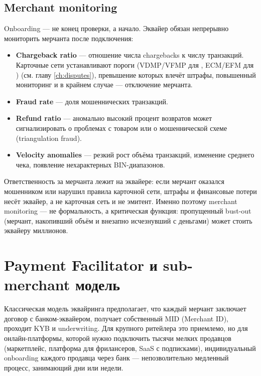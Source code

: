\subsection*{Merchant monitoring}

Onboarding — не конец проверки, а начало. Эквайер обязан непрерывно мониторить мерчанта после подключения:

\begin{itemize}
  \item \textbf{Chargeback ratio} — отношение числа chargebacks
        к числу транзакций. Карточные сети устанавливают пороги
        (VDMP/VFMP для , ECM/EFM
        для ) (см. главу \ref{ch:disputes}),
        превышение которых влечёт штрафы, повышенный мониторинг
        и в крайнем случае — отключение мерчанта.
  \item \textbf{Fraud rate} — доля мошеннических транзакций.
  \item \textbf{Refund ratio} — аномально высокий процент
        возвратов может сигнализировать о проблемах с товаром
        или о мошеннической схеме (triangulation fraud).
  \item \textbf{Velocity anomalies} — резкий рост объёма
        транзакций, изменение среднего чека, появление
        нехарактерных BIN-диапазонов.
\end{itemize}

\begin{kaobox}[title=Важно, colback=red!5, colbacktitle=red!20]
  Ответственность за мерчанта лежит на эквайере: если мерчант
  оказался мошенником или нарушил правила карточной сети,
  штрафы и финансовые потери несёт эквайер, а не карточная сеть
  и не эмитент. Именно поэтому merchant monitoring — не
  формальность, а критическая функция: пропущенный bust-out
  (мерчант, накопивший объём и внезапно исчезнувший с деньгами)
  может стоить эквайеру миллионов.
\end{kaobox}

\section{Payment Facilitator и sub-merchant модель}
\label{sec:ia-payfac}

Классическая модель эквайринга предполагает, что каждый мерчант
заключает договор с банком-эквайером, получает собственный
MID (Merchant ID), проходит KYB и underwriting. Для крупного
ритейлера это приемлемо, но для онлайн-платформы, которой
нужно подключить тысячи мелких продавцов (маркетплейс,
платформа для фрилансеров, SaaS с подписками), индивидуальный
onboarding каждого продавца через банк — непозволительно
медленный процесс, занимающий дни или недели.


